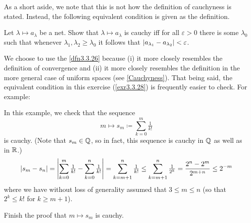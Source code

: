 As a short aside, we note that this is not how the definition of cauchyness is stated.  Instead, the following equivalent condition is given as the definition.
\begin{exr}\label{exr3.3.28}
Let $\lambda \mapsto a_\lambda$ be a net.  Show that $\lambda \mapsto a_\lambda$ is cauchy iff for all $\varepsilon >0$ there is some $\lambda _0$ such that whenever $\lambda _1,\lambda _2\geq \lambda _0$ it follows that $\lvert a_{\lambda _1}-a_{\lambda _2}\rvert<\varepsilon$.
\end{exr}
We choose to use the \cref{dfn3.3.26} because (i) it more closely resembles the definition of convergence and (ii) it more closely resembles the definition in the more general case of uniform spaces (see \cref{Cauchyness}).  That being said, the equivalent condition in this exercise (\cref{exr3.3.28}) is frequently easier to check.  For example:
\begin{exm}\label{exm3.3.39}
In this example, we check that the sequence
\begin{equation}
m\mapsto s_m\coloneqq \sum _{k=0}^m\tfrac{1}{k!}
\end{equation}
is cauchy.  (Note that $s_m\in \mathbb{Q}$, so in fact, this sequence is cauchy in $\mathbb{Q}$ as well as in $\mathbb{R}$.)
\begin{equation}
\lvert s_m-s_n\rvert=\left| \sum _{k=0}^m\tfrac{1}{k!}-\sum _{k=0}^n\tfrac{1}{k!}\right| =\sum _{k=m+1}^n\tfrac{1}{k!}\leq \sum _{k=m+1}^n\tfrac{1}{2^k}=\frac{2^n-2^m}{2^{m+n}}\leq 2^{-m}
\end{equation}
where we have without loss of generality assumed that $3\leq m\leq n$ (so that $2^k\leq k!$ for $k\geq m+1$).
\begin{exr}
Finish the proof that $m\mapsto s_m$ is cauchy.
\end{exr}
\end{exm}

